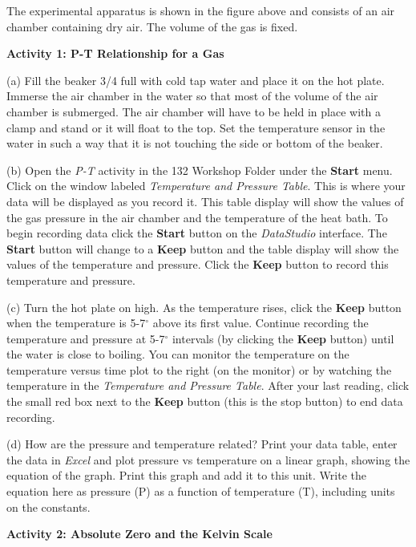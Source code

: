 The experimental apparatus is shown in the figure above and consists
of an air chamber containing dry air. The volume of the gas is fixed.

\textbf{Activity 1: P-T Relationship for a Gas}

(a) Fill the beaker 3/4 full with cold tap water and place it on the hot plate.  Immerse the air chamber in the water so that most of the volume of the air chamber is submerged.  The air chamber will have to be held in place with a clamp and stand or it will float to the top.  Set the temperature sensor in the water in such a way that it is not touching the side or bottom of the beaker.

(b) Open the {\it P-T} activity in the 132 Workshop Folder under the
{\bf Start} menu.
Click on the window labeled \textit{Temperature and Pressure Table}. 
This is where your data will be displayed as you record
it. This table display will show the values of the gas pressure in the air chamber and
the temperature of the heat bath. 
To begin recording data click
the {\bf Start} button on the {\it DataStudio} interface. 
The {\bf Start} button will change to a {\bf Keep} button and the table
display will show the values of the temperature and pressure. 
Click the {\bf Keep} button to record this temperature and pressure.

(c) Turn the hot plate on high.  As the temperature rises, click the {\bf Keep} button when the temperature is 5-7\( ^{\circ } \) above its first value.  Continue recording the temperature and pressure at 5-7\( ^{\circ } \) intervals (by clicking the {\bf Keep} button) until the water is close to boiling.  You can monitor the temperature on the temperature versus time plot to the right (on the monitor) or by watching the temperature in the \textit{Temperature and Pressure Table}.  After your last reading, click the small red box next to the {\bf Keep} button (this is the stop button) to end data recording.

(d) How are the pressure and temperature related?  Print your data table, enter the data in \textit{Excel} and plot pressure vs temperature on a linear graph, showing the equation of the graph.  Print this graph and add it to this unit. 
Write the equation here as pressure (P) as a function of temperature (T), 
including units on the constants.
\vspace{15mm}



\textbf{Activity 2: Absolute Zero and the Kelvin Scale}

